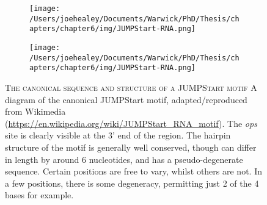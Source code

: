 \begin{figure}[h]
\centering
  \begin{subfigure}{0.49\textwidth}
    \texttt{[image: /Users/joehealey/Documents/Warwick/PhD/Thesis/chapters/chapter6/img/JUMPStart-RNA.png]}
  \end{subfigure}
  \begin{subfigure}{0.49\textwidth}
    \texttt{[image: /Users/joehealey/Documents/Warwick/PhD/Thesis/chapters/chapter6/img/JUMPStart-RNA.png]}
  \end{subfigure}
  
    \captionsetup{singlelinecheck=off, justification=justified, font=footnotesize, aboveskip=10pt}
    \caption[The canoncial semi-degenerate JUMPStart motif]{\textsc{\normalsize The canonical sequence and structure of a JUMPStart motif} \vspace{0.1cm} \newline A diagram of the canonical JUMPStart motif, adapted/reproduced from Wikimedia (\url{https://en.wikipedia.org/wiki/JUMPStart_RNA_motif}). The \emph{ops} site is clearly visible at the 3' end of the region. The hairpin structure of the motif is generally well conserved, though can differ in length by around 6 nucleotides, and has a pseudo-degenerate sequence. Certain positions are free to vary, whilst others are not. In a few positions, there is some degeneracy, permitting just 2 of the 4 bases for example.}
\label{canonicaljs}
\end{figure}



